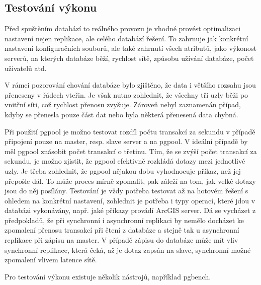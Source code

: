\subsection{Testování výkonu}
Před spuštěním databází to reálného provozu je vhodné provést optimalizaci nastavení nejen replikace, ale celého databází řešení. To zahrnuje jak konkrétní nastavení konfiguračních souborů, ale také zahrnutí všech atributů, jako výkonost serverů, na kterých databáze běží, rychlost sítě, způsobu užívání databáze, počet uživatelů atd. 

V rámci pozorování chování databáze bylo zjištěno, že data i většího rozsahu jsou přeneseny v řádech vteřin. Je však nutno zohlednit, že všechny tři uzly běži po vnitřní síti, což rychlost přenosu zvyšuje. Zároveň nebyl zaznamenán případ, kdyby se přenesla pouze část dat nebo byla některá přenesená data chybná. 

Při použití pgpool je možno testovat rozdíl počtu transakcí za sekundu v případě připojení pouze na master, resp. slave server a na pgpool. V ideální případě by měl pgpool znásobit počet transakcí o třetinu. Tím, že se zvýší počet transakcí za sekundu, je možno zjistit, že pgpool efektivně rozkládá dotazy mezi jednotlivé uzly. Je třeba zohlednit, že pgpool nějakou dobu vyhodnocuje příkaz, než jej přepošle dál. To může proces mírně zpomalit, pak záleží na tom, jak velké dotazy jsou do něj posílány. 
Testování je vždy potřeba testovat až na hotovém řešení s ohledem na konkrétní nastavení, zohlednit je potřeba i typy operací, které jdou v databázi vykonávány, např. jaké příkazy provádí ArcGIS server.
Dá se vycházet z předpokladů, že při synchronní i asynchronní replikaci by nemělo docházet ke zpomalení přenosu transakcí při čtení z databáze a stejně tak u asynchronní replikace při zápisu na master. V případě zápisu do databáze může mít vliv synchronní replikace, která čeká, až je dotaz zapsán na slave, synchronní možné zpomalení vlivem latence sítě. 

Pro testování výkonu existuje několik nástrojů, například pgbench. 
